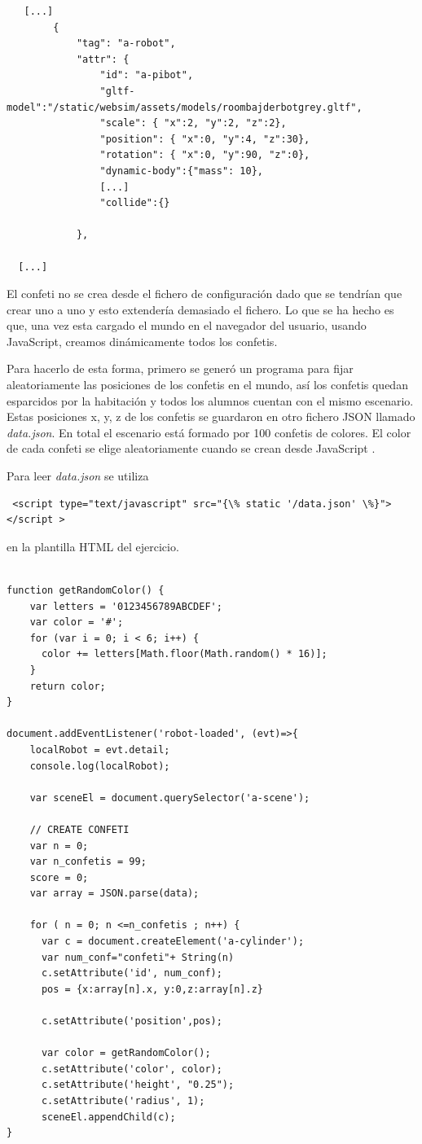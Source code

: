\begin{lstlisting}
   [...]
        {
            "tag": "a-robot",
            "attr": {
                "id": "a-pibot",
                "gltf-model":"/static/websim/assets/models/roombajderbotgrey.gltf",
                "scale": { "x":2, "y":2, "z":2},
                "position": { "x":0, "y":4, "z":30},
                "rotation": { "x":0, "y":90, "z":0},
                "dynamic-body":{"mass": 10},
                [...]
                "collide":{}

            },
           
  [...]
\end{lstlisting}

El confeti no se crea desde el fichero de configuración dado que se tendrían que crear uno a uno y esto extendería demasiado el fichero. Lo que se ha hecho es que, una vez esta cargado el mundo en el navegador del usuario, usando JavaScript, creamos dinámicamente todos los confetis.

Para hacerlo de esta forma, primero se generó un programa para fijar aleatoriamente las posiciones de los confetis en el mundo, así los confetis quedan esparcidos por la habitación y todos los alumnos cuentan con el mismo escenario. Estas posiciones x, y, z de los confetis se guardaron en otro fichero JSON llamado \textit{data.json}. En total el escenario está formado por 100 confetis de colores. El color de cada confeti se elige aleatoriamente cuando se crean desde JavaScript .

Para leer \textit{data.json} se utiliza
\begin{lstlisting}
 <script type="text/javascript" src="{\% static '/data.json' \%}"></script > 
 \end{lstlisting}
en la plantilla HTML del ejercicio.

\begin{lstlisting}

function getRandomColor() {
    var letters = '0123456789ABCDEF';
    var color = '#';
    for (var i = 0; i < 6; i++) {
      color += letters[Math.floor(Math.random() * 16)];
    }
    return color;
}

document.addEventListener('robot-loaded', (evt)=>{
    localRobot = evt.detail;
    console.log(localRobot);

    var sceneEl = document.querySelector('a-scene');

    // CREATE CONFETI
    var n = 0;
    var n_confetis = 99;
    score = 0;
    var array = JSON.parse(data);

    for ( n = 0; n <=n_confetis ; n++) {
      var c = document.createElement('a-cylinder');
      var num_conf="confeti"+ String(n)
      c.setAttribute('id', num_conf);
      pos = {x:array[n].x, y:0,z:array[n].z}
    
      c.setAttribute('position',pos);
    
      var color = getRandomColor();
      c.setAttribute('color', color);
      c.setAttribute('height', "0.25");
      c.setAttribute('radius', 1);
      sceneEl.appendChild(c);
}
\end{lstlisting}

